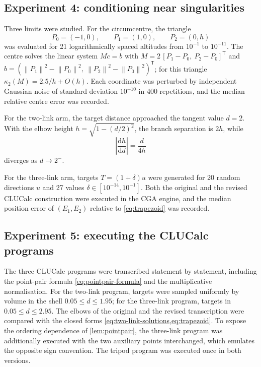 \documentclass[11pt,a4paper]{article}
\theoremstyle{plain}
\theoremstyle{definition}
\theoremstyle{remark}
\newcommand{\T}{\mathsf{T}}
\newcommand{\norm}[1]{\left\lVert#1\right\rVert}
\newcommand{\abs}[1]{\left\lvert#1\right\rvert}
\begin{document}
\subsection{Experiment 4: conditioning near singularities}\label{sec:conditioning}

Three limits were studied. For the circumcentre, the triangle
\begin{equation}
  P_0=(-1,0),\qquad P_1=(1,0),\qquad P_2=(0,h)
  \label{eq:thin-triangle}
\end{equation}
was evaluated for 21 logarithmically spaced altitudes from $10^{-1}$ to
$10^{-11}$. The centre solves the linear system $Mc=b$ with
$M=2\,[P_1-P_0,\ P_2-P_0]^{\T}$ and
$b=(\norm{P_1}^2-\norm{P_0}^2,\ \norm{P_2}^2-\norm{P_0}^2)^{\T}$; for this
triangle $\kappa_2(M)=2.5/h+O(h)$. Each coordinate was perturbed by independent
Gaussian noise of standard deviation $10^{-10}$ in 400 repetitions, and the
median relative centre error was recorded.

For the two-link arm, the target distance approached the tangent value $d=2$.
With the elbow height $h=\sqrt{1-(d/2)^2}$, the branch separation is $2h$,
while
\begin{equation}
  \abs{\frac{\mathrm dh}{\mathrm dd}}=\frac{d}{4h}
  \label{eq:elbow-sensitivity}
\end{equation}
diverges as $d\to2^-$.

For the three-link arm, targets $T=(1+\delta)u$ were generated for 20 random
directions $u$ and 27 values $\delta\in[10^{-14},10^{-1}]$. Both the original
and the revised CLUCalc construction were executed in the CGA engine, and the
median position error of $(E_1,E_2)$ relative to \cref{eq:trapezoid} was
recorded.

\subsection{Experiment 5: executing the CLUCalc programs}\label{sec:exp-cga}

The three CLUCalc programs were transcribed statement by statement, including
the point-pair formula \cref{eq:pointpair-formula} and the multiplicative
normalisation. For the two-link program, \CGATrials{} targets were sampled
uniformly by volume in the shell $0.05\le d\le1.95$; for the three-link
program, \CGATrials{} targets in $0.05\le d\le2.95$. The elbows of the original
and the revised transcription were compared with the closed forms
\cref{eq:two-link-solutions,eq:trapezoid}. To expose the ordering dependence
of \cref{lem:pointpair}, the three-link program was additionally executed with
the two auxiliary points interchanged, which emulates the opposite sign
convention. The tripod program was executed once in both versions.
\end{document}

